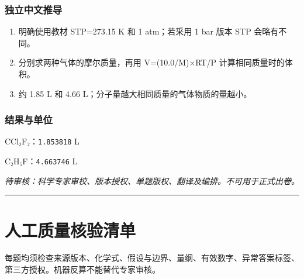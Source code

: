 \documentclass[UTF8,11pt,oneside,openany,fontset=none]{ctexbook}
\begin{document}
\subsection*{独立中文推导}
\begin{enumerate}
\item 明确使用教材 STP=273.15 K 和 1 atm；若采用 1 bar 版本 STP 会略有不同。
\item 分别求两种气体的摩尔质量，再用 V=(10.0/M)×RT/P 计算相同质量时的体积。
\item 约 1.85 L 和 4.66 L；分子量越大相同质量的气体物质的量越小。
\end{enumerate}
\subsection*{结果与单位}
\noindent CCl₂F₂：\texttt{1.853818} L\par
\noindent C₂H₅F：\texttt{4.663746} L\par
\noindent\textit{待审核：科学专家审校、版本授权、单题版权、翻译及编排。不可用于正式出卷。}
\medskip\hrule\medskip
\backmatter
\chapter*{人工质量核验清单}
每题均须检查来源版本、化学式、假设与边界、量纲、有效数字、异常答案标签、第三方授权。机器反算不能替代专家审核。
\end{document}
